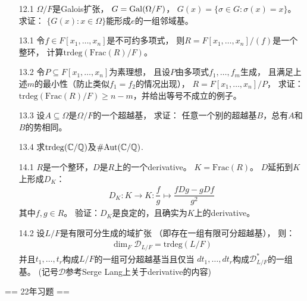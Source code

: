 \begin{itemize}
    \item[12.1]
    $\Omega/F$是Galois扩张，
		$G=\operatorname{Gal}(\Omega/F)$，
		$G(x)=\{\sigma\in G:\sigma(x)=x\}$。
		求证：
		$\{G(x):x\in \Omega\}$能形成$e$的一组邻域基。

    \item[13.1]令$f\in F[x_1,\ldots,x_n]$是不可约多项式，
		则$R=F[x_1,\ldots,x_n]/(f)$是一个整环，
		计算$\mathrm{trdeg}(\mathrm{Frac}(R)/F)$。
    
    \item[13.2]令$P\subseteq F[x_1,\ldots,x_n]$为素理想，
		且设$P$由多项式$f_1,\ldots,f_m$生成，
		且满足上述$m$的最小性（防止类似$f_1=f_2$的情况出现），
		$R=F[x_1,\ldots,x_n]/P$，
		求证：$\mathrm{trdeg}(\mathrm{Frac}(R)/F)\geqslant n-m$，并给出等号不成立的例子。

    \item[13.3]
    设$A\subseteq\Omega$是$\Omega/F$的一个超越基，
		求证：
		任意一个别的超越基$B$，总有$A$和$B$的势相同。

    \item[13.4]
    求$\mathrm{trdeg}(\mathbb{C}/\mathbb{Q})$及$\# \mathrm{Aut}(\mathbb{C}/\mathbb{Q})$.

    \item[14.1]
    $R$是一个整环，$D$是$R$上的一个derivative。
		$K=\mathrm{Frac}(R)$。
		$D$延拓到$K$上形成$D_K$：
		\begin{align*}
			D_K:K\to K:\dfrac{f}{g}\mapsto\dfrac{fDg-gDf}{g^2}
		\end{align*}
		其中$f,g\in R$。
        验证：$D_K$是良定的，且确实为$K$上的derivative。

    \item[14.2]设$L/F$是有限可分生成的域扩张
		（即存在一组有限可分超越基），
		则：
		\begin{align*}
			\dim_F\mathcal{D}_{L/F}
			=
			\mathrm{trdeg}(L/F)
		\end{align*}
		并且$t_1,\ldots,t_r$构成$L/F$的一组可分超越基当且仅当
		$dt_1,\ldots,dt_r$构成$\mathcal{D}_{L/F}^*$的一组基。
        (记号$\mathcal{D}$参考Serge Lang上关于derivative的内容)
    
\end{itemize}

== 22年习题 ==

